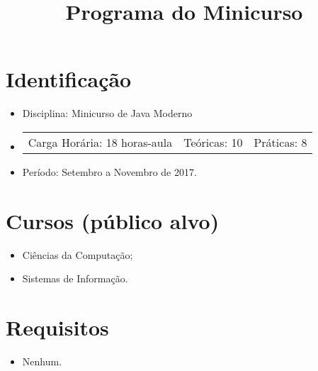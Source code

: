 \documentclass{article}
\title{Programa do Minicurso}
\author{}
\date{}
\begin{document}
\maketitle

\section{Identificação}

\begin{itemize}
    \item[] Disciplina: Minicurso de Java Moderno
    \item[]
        \hspace{-1em}
        \begin{tabular}{ccc}
            Carga Horária: 18 horas-aula&
            Teóricas: 10&
            Práticas: 8
        \end{tabular}
    \item[] Período: Setembro a Novembro de 2017.
\end{itemize}

\section{Cursos (público alvo)}
\begin{itemize}
    \item[] Ciências da Computação;
    \item[] Sistemas de Informação.
\end{itemize}

\section{Requisitos}
\begin{itemize}
    \item[] Nenhum.
\end{itemize}
\end{document}
